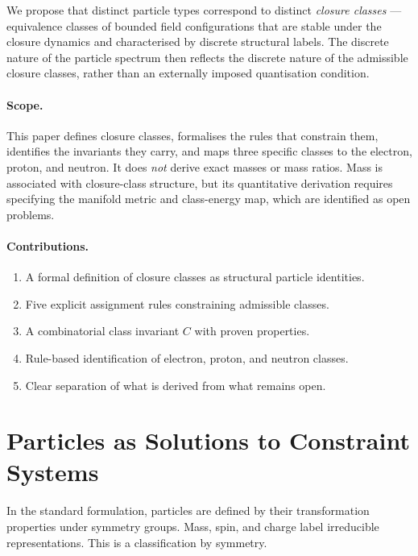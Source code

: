 \documentclass[12pt]{article}
\begin{document}
We propose that distinct particle types correspond to distinct \textit{closure classes} --- equivalence classes of bounded field configurations that are stable under the closure dynamics and characterised by discrete structural labels. The discrete nature of the particle spectrum then reflects the discrete nature of the admissible closure classes, rather than an externally imposed quantisation condition.

\paragraph{Scope.} This paper defines closure classes, formalises the rules that constrain them, identifies the invariants they carry, and maps three specific classes to the electron, proton, and neutron. It does \textit{not} derive exact masses or mass ratios. Mass is associated with closure-class structure, but its quantitative derivation requires specifying the manifold metric and class-energy map, which are identified as open problems.

\paragraph{Contributions.}
\begin{enumerate}
    \item A formal definition of closure classes as structural particle identities.
    \item Five explicit assignment rules constraining admissible classes.
    \item A combinatorial class invariant $C$ with proven properties.
    \item Rule-based identification of electron, proton, and neutron classes.
    \item Clear separation of what is derived from what remains open.
\end{enumerate}

\section{Particles as Solutions to Constraint Systems}\label{sec:philosophy}

In the standard formulation, particles are defined by their transformation properties under symmetry groups. Mass, spin, and charge label irreducible representations. This is a classification by symmetry.
\end{document}
